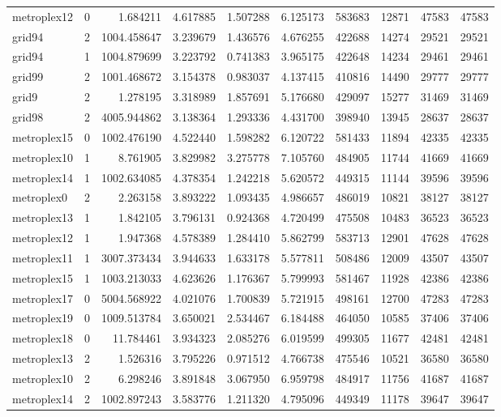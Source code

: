 \documentclass[../../../thesis.tex]{subfiles}
\begin{document}
\begin{longtable}{|l|r|r|r|r|r|r|r|r|r|}
metroplex12 & 0 & 1.684211 & 4.617885 & 1.507288 & 6.125173 & 583683 & 12871 & 47583 & 47583 \\
grid94 & 2 & 1004.458647 & 3.239679 & 1.436576 & 4.676255 & 422688 & 14274 & 29521 & 29521 \\
grid94 & 1 & 1004.879699 & 3.223792 & 0.741383 & 3.965175 & 422648 & 14234 & 29461 & 29461 \\
grid99 & 2 & 1001.468672 & 3.154378 & 0.983037 & 4.137415 & 410816 & 14490 & 29777 & 29777 \\
grid9 & 2 & 1.278195 & 3.318989 & 1.857691 & 5.176680 & 429097 & 15277 & 31469 & 31469 \\
grid98 & 2 & 4005.944862 & 3.138364 & 1.293336 & 4.431700 & 398940 & 13945 & 28637 & 28637 \\
metroplex15 & 0 & 1002.476190 & 4.522440 & 1.598282 & 6.120722 & 581433 & 11894 & 42335 & 42335 \\
metroplex10 & 1 & 8.761905 & 3.829982 & 3.275778 & 7.105760 & 484905 & 11744 & 41669 & 41669 \\
metroplex14 & 1 & 1002.634085 & 4.378354 & 1.242218 & 5.620572 & 449315 & 11144 & 39596 & 39596 \\
metroplex0 & 2 & 2.263158 & 3.893222 & 1.093435 & 4.986657 & 486019 & 10821 & 38127 & 38127 \\
metroplex13 & 1 & 1.842105 & 3.796131 & 0.924368 & 4.720499 & 475508 & 10483 & 36523 & 36523 \\
metroplex12 & 1 & 1.947368 & 4.578389 & 1.284410 & 5.862799 & 583713 & 12901 & 47628 & 47628 \\
metroplex11 & 1 & 3007.373434 & 3.944633 & 1.633178 & 5.577811 & 508486 & 12009 & 43507 & 43507 \\
metroplex15 & 1 & 1003.213033 & 4.623626 & 1.176367 & 5.799993 & 581467 & 11928 & 42386 & 42386 \\
metroplex17 & 0 & 5004.568922 & 4.021076 & 1.700839 & 5.721915 & 498161 & 12700 & 47283 & 47283 \\
metroplex19 & 0 & 1009.513784 & 3.650021 & 2.534467 & 6.184488 & 464050 & 10585 & 37406 & 37406 \\
metroplex18 & 0 & 11.784461 & 3.934323 & 2.085276 & 6.019599 & 499305 & 11677 & 42481 & 42481 \\
metroplex13 & 2 & 1.526316 & 3.795226 & 0.971512 & 4.766738 & 475546 & 10521 & 36580 & 36580 \\
metroplex10 & 2 & 6.298246 & 3.891848 & 3.067950 & 6.959798 & 484917 & 11756 & 41687 & 41687 \\
metroplex14 & 2 & 1002.897243 & 3.583776 & 1.211320 & 4.795096 & 449349 & 11178 & 39647 & 39647 \\

\end{longtable}
\end{document}
